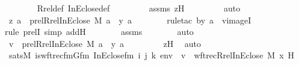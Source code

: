 \begin{isabellebody}
\ \ \ \ \ \ \isamarkupfalse%
\ Rrel{\isacharunderscore}{\kern0pt}def\ InEclose{\isacharunderscore}{\kern0pt}def\ \isanewline
\ \ \ \ \ \ \isamarkupfalse%
\ assms{}\ zH\ \isanewline
\ \ \ \ \ \ \isamarkupfalse%
\ auto\ \isanewline
\ \ \ \ \isamarkupfalse%
\ {\isachardoublequoteopen}{\isacharless}{\kern0pt}z{\isacharcomma}{\kern0pt}\ a{\isachargreater}{\kern0pt}\ {\isasymin}\ prel{\isacharparenleft}{\kern0pt}Rrel{\isacharparenleft}{\kern0pt}InEclose{\isacharcomma}{\kern0pt}\ M{\isacharparenright}{\kern0pt}{\isacharcomma}{\kern0pt}\ {\isacharbraceleft}{\kern0pt}a{\isacharbraceright}{\kern0pt}{\isacharparenright}{\kern0pt}\ {\isacharminus}{\kern0pt}{\isacharbackquote}{\kern0pt}{\isacharbackquote}{\kern0pt}\ {\isacharbraceleft}{\kern0pt}{\isasymlangle}y{\isacharcomma}{\kern0pt}\ a{\isasymrangle}{\isacharbraceright}{\kern0pt}{\isachardoublequoteclose}\ \isanewline
\ \ \ \ \ \ \isamarkupfalse%
{\isacharparenleft}{\kern0pt}rule{\isacharunderscore}{\kern0pt}tac\ b{\isacharequal}{\kern0pt}{\isachardoublequoteopen}{\isacharless}{\kern0pt}y{\isacharcomma}{\kern0pt}\ a{\isachargreater}{\kern0pt}{\isachardoublequoteclose}\ \ vimageI{\isacharparenright}{\kern0pt}\isanewline
\ \ \ \ \ \ \ \isamarkupfalse%
{\isacharparenleft}{\kern0pt}rule\ prelI{\isacharcomma}{\kern0pt}\ simp\ add{\isacharcolon}{\kern0pt}H{\isacharparenright}{\kern0pt}\isanewline
\ \ \ \ \ \ \isamarkupfalse%
\ assms\isanewline
\ \ \ \ \ \ \isamarkupfalse%
\ auto\ \isanewline
\ \ \ \ \isamarkupfalse%
\ \isamarkupfalse%
\ {\isachardoublequoteopen}v\ {\isasymin}\ prel{\isacharparenleft}{\kern0pt}Rrel{\isacharparenleft}{\kern0pt}InEclose{\isacharcomma}{\kern0pt}\ M{\isacharparenright}{\kern0pt}{\isacharcomma}{\kern0pt}\ {\isacharbraceleft}{\kern0pt}a{\isacharbraceright}{\kern0pt}{\isacharparenright}{\kern0pt}\ {\isacharminus}{\kern0pt}{\isacharbackquote}{\kern0pt}{\isacharbackquote}{\kern0pt}\ {\isacharbraceleft}{\kern0pt}{\isasymlangle}y{\isacharcomma}{\kern0pt}\ a{\isasymrangle}{\isacharbraceright}{\kern0pt}{\isachardoublequoteclose}\ \isanewline
\ \ \ \ \ \ \isamarkupfalse%
\ zH\ \isamarkupfalse%
\ auto\isanewline
\ \ \isamarkupfalse%
\isanewline
\isanewline
\ \ \isamarkupfalse%
\ {\isachardoublequoteopen}sats{\isacharparenleft}{\kern0pt}M{\isacharcomma}{\kern0pt}\ is{\isacharunderscore}{\kern0pt}wftrec{\isacharunderscore}{\kern0pt}fm{\isacharparenleft}{\kern0pt}Gfm{\isacharcomma}{\kern0pt}\ InEclose{\isacharunderscore}{\kern0pt}fm{\isacharcomma}{\kern0pt}\ i{\isacharcomma}{\kern0pt}\ j{\isacharcomma}{\kern0pt}\ k{\isacharparenright}{\kern0pt}{\isacharcomma}{\kern0pt}\ env{\isacharparenright}{\kern0pt}\ {\isasymlongleftrightarrow}\ v\ {\isacharequal}{\kern0pt}\ wftrec{\isacharparenleft}{\kern0pt}Rrel{\isacharparenleft}{\kern0pt}InEclose{\isacharcomma}{\kern0pt}\ M{\isacharparenright}{\kern0pt}{\isacharcomma}{\kern0pt}\ x{\isacharcomma}{\kern0pt}\ H{\isacharparenright}{\kern0pt}{\isachardoublequoteclose}\ \isanewline

\end{isabellebody}
